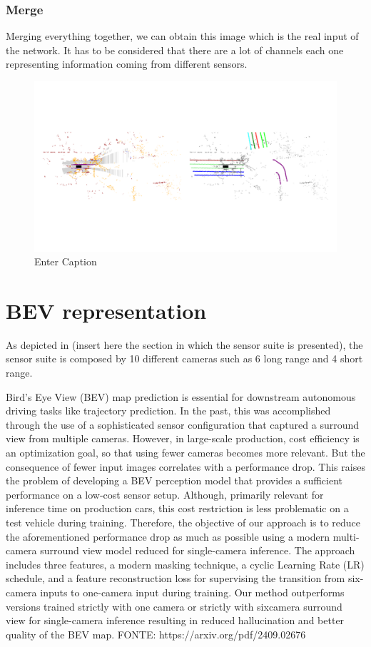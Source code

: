 \subsubsection{Merge}
Merging everything together, we can obtain this image which is the real input of the network. It has to be considered that there are a lot of channels each one representing information coming from different sensors. 
\begin{figure}
    \centering
    \includegraphics[width=1\linewidth]{LateX//figs/inputt.pdf}
    \caption{Enter Caption}
    \label{fig:enter-label}
\end{figure}


\section{BEV representation}
As depicted in (insert here the section in which the sensor suite is presented), the sensor suite is composed by 10 different cameras such as 6 long range and 4 short range. 

Bird’s Eye View (BEV) map prediction is essential for downstream autonomous driving tasks like trajectory
prediction. In the past, this was accomplished through the
use of a sophisticated sensor configuration that captured a
surround view from multiple cameras. However, in large-scale
production, cost efficiency is an optimization goal, so that using
fewer cameras becomes more relevant. But the consequence
of fewer input images correlates with a performance drop.
This raises the problem of developing a BEV perception
model that provides a sufficient performance on a low-cost
sensor setup. Although, primarily relevant for inference time
on production cars, this cost restriction is less problematic on
a test vehicle during training. Therefore, the objective of our
approach is to reduce the aforementioned performance drop
as much as possible using a modern multi-camera surround
view model reduced for single-camera inference. The approach
includes three features, a modern masking technique, a cyclic
Learning Rate (LR) schedule, and a feature reconstruction
loss for supervising the transition from six-camera inputs to
one-camera input during training. Our method outperforms
versions trained strictly with one camera or strictly with sixcamera surround view for single-camera inference resulting in
reduced hallucination and better quality of the BEV map.
FONTE:
https://arxiv.org/pdf/2409.02676


